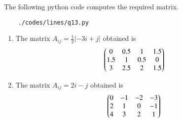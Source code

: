 	
	The following python code computes the required matrix.
	\begin{lstlisting}
	./codes/lines/q13.py
	\end{lstlisting}
	
	\begin{enumerate}
		\item The matrix $A_{ij} = \frac{1}{2}|-3i+j|$ obtained is
		\begin{align}
			\begin{pmatrix}0&0.5&1&1.5\\1.5&1&0.5&0\\3&2.5&2&1.5\end{pmatrix}
		\end{align}
		\item The matrix $A_{ij} = 2i-j$ obtained is
		\begin{align}
			\begin{pmatrix}0&-1&-2&-3\\2&1&0&-1\\4&3&2&1\end{pmatrix}
		\end{align}
	\end{enumerate}
	
	
